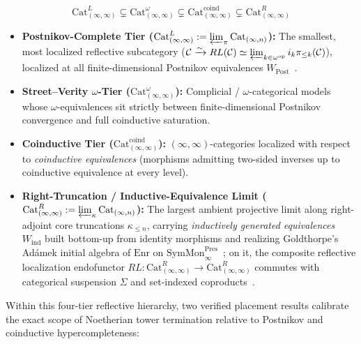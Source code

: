 \[
  \mathrm{Cat}^L_{(\infty, \infty)} \subsetneq \mathrm{Cat}^\omega_{(\infty, \infty)} \subsetneq \mathrm{Cat}^{\mathrm{coind}}_{(\infty, \infty)} \subsetneq \mathrm{Cat}^R_{(\infty, \infty)}
\]

\begin{itemize}

  \item \textbf{Postnikov-Complete Tier ($\mathrm{Cat}^L_{(\infty, \infty)} := \varprojlim_\pi \mathrm{Cat}_{(\infty, n)}$):} The smallest, most localized reflective subcategory ($\mathcal{C} \xrightarrow{\sim} RL(\mathcal{C}) \simeq \varprojlim_{k \in \omega^{\mathrm{op}}} i_k \pi_{\le k}(\mathcal{C})$), localized at all finite-dimensional Postnikov equivalences $W_{\mathrm{Post}}$~\cite{ORW26,GepnerHeine26}.

  \item \textbf{Street--Verity $\omega$-Tier ($\mathrm{Cat}^\omega_{(\infty, \infty)}$):} Complicial / $\omega$-categorical models whose $\omega$-equivalences sit strictly between finite-dimensional Postnikov convergence and full coinductive saturation.

  \item \textbf{Coinductive Tier ($\mathrm{Cat}^{\mathrm{coind}}_{(\infty, \infty)}$):} $(\infty, \infty)$-categories localized with respect to \emph{coinductive equivalences} (morphisms admitting two-sided inverses up to coinductive equivalence at every level).

  \item \textbf{Right-Truncation / Inductive-Equivalence Limit ($\mathrm{Cat}^R_{(\infty, \infty)} := \varprojlim_\kappa \mathrm{Cat}_{(\infty, n)}$):} The largest ambient projective limit along right-adjoint core truncations $\kappa_{\le n}$, carrying \emph{inductively generated equivalences} $W_{\mathrm{ind}}$ built bottom-up from identity morphisms and realizing Goldthorpe's Ad\'amek initial algebra of $\mathrm{Enr}$ on $\mathrm{SymMon}^{\mathrm{Pres}}_\infty$~\cite[Theorem~3.3.5]{Goldthorpe23}; on it, the composite reflective localization endofunctor $RL : \mathrm{Cat}^R_{(\infty, \infty)} \to \mathrm{Cat}^R_{(\infty, \infty)}$ commutes with categorical suspension $\Sigma$ and set-indexed coproducts~\cite{ORW26,GepnerHeine26}.

\end{itemize}

Within this four-tier reflective hierarchy, two verified placement results calibrate the exact scope of Noetherian tower termination relative to Postnikov and coinductive hypercompleteness:

